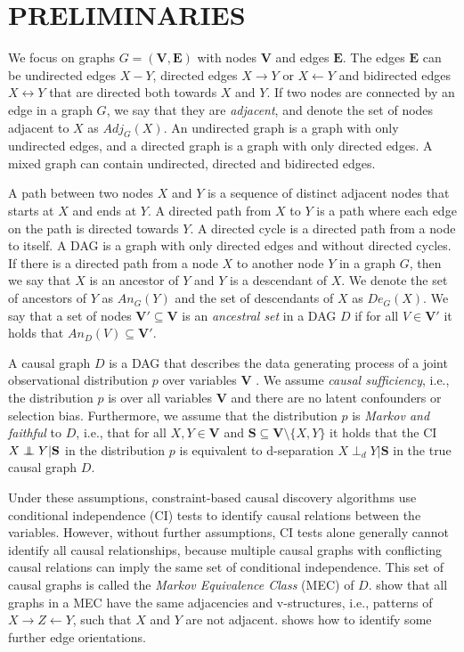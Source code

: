 \section{PRELIMINARIES}
\label{sec:preliminaries}

We focus on graphs $G=(\mathbf{V}, \mathbf{E})$ with nodes $\mathbf{V}$ and edges $\mathbf{E}$.
The edges $\mathbf{E}$ can be undirected edges $X-Y$, directed edges $X \to Y$ or $X \gets Y$ and bidirected edges $X \leftrightarrow Y$ that are directed both towards $X$ and $Y$.
If two nodes are connected by an edge in a graph $G$, we say that they are \emph{adjacent}, and denote the set of nodes adjacent to $X$ as $Adj_G(X)$.
An undirected graph is a graph with only undirected edges, and a directed graph is a graph with only directed edges.
A mixed graph can contain undirected, directed and bidirected edges.

A path between two nodes $X$ and $Y$ is a sequence of distinct adjacent nodes that starts at $X$ and ends at $Y$.
A directed path from $X$ to $Y$ is a path where each edge on the path is directed towards $Y$.
A directed cycle is a directed path from a node to itself.
A \ac{DAG} is a graph with only directed edges and without directed cycles.
If there is a directed path from a node $X$ to another node $Y$ in a graph $G$, then we say that $X$ is an ancestor of $Y$ and $Y$ is a descendant of $X$.
We denote the set of ancestors of $Y$ as $An_G(Y)$ and the set of descendants of $X$ as $De_G(X)$.
We say that a set of nodes $\mathbf{V}' \subseteq \mathbf{V}$ is an \emph{ancestral set} in a DAG $D$ if for all $V \in \mathbf{V}'$ it holds that $An_D(V) \subseteq \mathbf{V}'$.

A causal graph $D$ is a \ac{DAG} that describes the data generating process of a joint observational distribution $p$ over variables $\mathbf{V}$ \citep{pearl2009causality}.
We assume \emph{causal sufficiency}, i.e., the distribution $p$ is over all variables $\mathbf{V}$ and 
there are no latent confounders or selection bias.
Furthermore, we assume that the distribution $p$ is \emph{Markov and faithful} to $D$, i.e., that for all $X,Y \in \mathbf{V}$ and $\mathbf{S} \subseteq \mathbf{V}\setminus \{X,Y\}$ it holds that the \acl{CI} $X \perp\kern-6pt\perp Y | \mathbf{S}$ in the distribution $p$ is equivalent to d-separation $X \perp_d Y | \mathbf{S}$ in the true causal graph $D$.

Under these assumptions, constraint-based causal discovery algorithms use conditional independence (CI) tests to identify causal relations between the variables.
However, without further assumptions, \ac{CI} tests alone generally cannot identify all causal relationships, because multiple causal graphs with conflicting causal relations can imply the same set of conditional independence.
This set of causal graphs is called the \emph{Markov Equivalence Class} (\ac{MEC}) of $D$.
\citet{verma90equivalence} show that all graphs in a \ac{MEC} have the same adjacencies and v-structures, i.e., patterns of $X \to Z \gets Y$, such that $X$ and $Y$ are not adjacent. \citet{meek1995causal} shows how to identify some further edge orientations.


